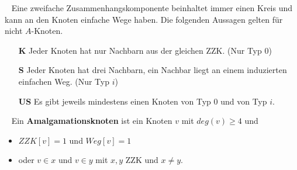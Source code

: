 \begin{defi}~\newline
Eine zweifache Zusammenhangskomponente beinhaltet immer einen Kreis und kann an den Knoten einfache Wege haben. Die folgenden Aussagen gelten für nicht $A$-Knoten. 
\begin{itemize}
\item[\textbf{K}] Jeder Knoten hat nur Nachbarn aus der gleichen ZZK. (Nur Typ $0$)
\item[\textbf{S}] Jeder Knoten hat drei Nachbarn, ein Nachbar liegt an einem induzierten einfachen Weg. (Nur Typ $i$)
\item[\textbf{US}] Es gibt jeweils mindestens einen Knoten von Typ $0$ und von Typ $i$.
\end{itemize}
\end{defi}
\begin{defi}[Amalgamationsknoten]~\newline
Ein \textbf{Amalgamationsknoten} ist ein Knoten $v$ mit $deg(v)\geq 4$ und 
\begin{itemize}
\item $ZZK[v]=1$ und $Weg[v]=1$
\item oder $v \in x$ und $v \in y$ mit $x,y$ ZZK und $x \neq y$.
\end{itemize}
\end{defi}
\newpage
